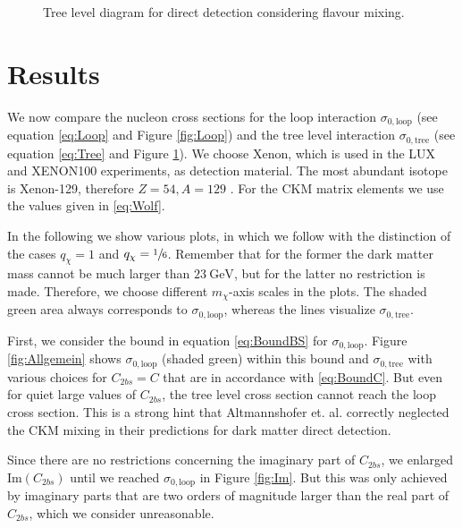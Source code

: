 \begin{figure}
	\centering
	\resizebox{.3\textwidth}{!}{
		
	}
	\caption{Tree level diagram for direct detection considering flavour mixing.}
	\label{fig:Tree}
\end{figure}

\section{Results}
We now compare the nucleon cross sections for the loop interaction $\sigma_{0,\text{loop}}$ (see equation \eqref{eq:Loop} and Figure \ref{fig:Loop}) and the tree level interaction $\sigma_{0,\text{tree}}$ (see equation \eqref{eq:Tree} and Figure \ref{fig:Tree}). We choose Xenon, which is used in the LUX and XENON100 experiments, as detection material. The most abundant isotope is Xenon-129, therefore $Z = 54, A=129$ \cite{DD}. For the CKM matrix elements we use the values given in \eqref{eq:Wolf}.


In the following we show various plots, in which we follow \cite{Z} with the distinction of the cases $q_\chi= 1$ and $q_\chi=\sfrac{1}{6}$. Remember that for the former the dark matter mass cannot be much larger than $\SI{23}{\giga\electronvolt}$, but for the latter no restriction is made. Therefore, we choose different $m_\chi$-axis scales in the plots. The shaded green area always corresponds to $\sigma_{0,\text{loop}}$, whereas the lines visualize $\sigma_{0,\text{tree}}$.


First, we consider the bound in equation \eqref{eq:BoundBS} for $\sigma_{0,\text{loop}}$. Figure \ref{fig:Allgemein} shows $\sigma_{0,\text{loop}}$ (shaded green) within this bound and $\sigma_{0,\text{tree}}$ with various choices for $C_{2bs} = C$ that are in accordance with \eqref{eq:BoundC}. But even for quiet large values of $C_{2bs}$, the tree level cross section cannot reach the loop cross section. This is a strong hint that Altmannshofer et. al. correctly neglected the CKM mixing in their predictions for dark matter direct detection.


Since there are no restrictions concerning the imaginary part of $C_{2bs}$, we enlarged $\text{Im}(C_{2bs})$ until we reached $\sigma_{0,\text{loop}}$ in Figure \ref{fig:Im}. But this was only achieved by imaginary parts that are two orders of magnitude larger than the real part of $C_{2bs}$, which we consider unreasonable.


